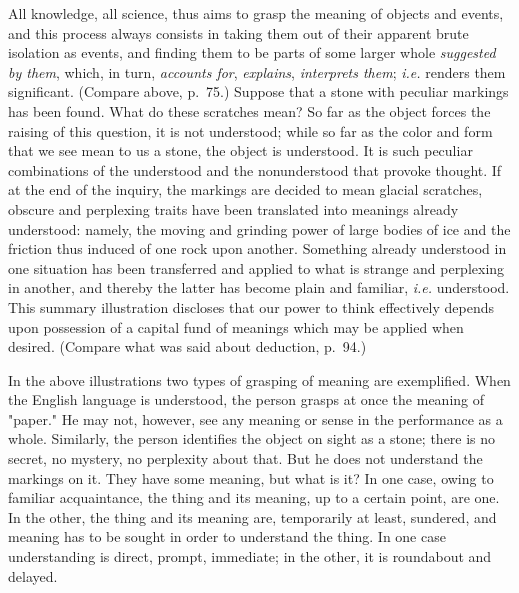 \documentclass[showtrims,ustradepaper]{memoir}
\begin{document}
All knowledge, all science, thus aims to grasp the meaning of objects
and events, and this process always consists in taking them out of their
apparent brute isolation as events, and finding them to be parts of
some
larger whole \emph{suggested by them}, which, in turn, \emph{accounts
for}, \emph{explains}, \emph{interprets them}; \emph{i.e.} renders them
significant. (Compare above, p.\ 75.) Suppose that a stone with peculiar
markings has been found. What do these scratches mean? So far as the
object forces the raising of this question, it is not understood; while
so far as the color and form that we see mean to us a stone, the object
is understood. It is such peculiar combinations of the understood and
the nonunderstood that provoke thought. If at the end of the inquiry,
the markings are decided to mean glacial scratches, obscure and
perplexing traits have been translated into meanings already understood:
namely, the moving and grinding power of large bodies of ice and the
friction thus induced of one rock upon another. Something already
understood in one situation has been transferred and applied to what is
strange and perplexing in another, and thereby the latter has become
plain and familiar, \emph{i.e.} understood. This summary illustration
discloses that our power to think effectively depends upon possession of
a capital fund of meanings which may be applied when desired. (Compare
what was said about deduction, p.\ 94.)



In the above illustrations two types of grasping of meaning are
exemplified. When the English language is understood, the person grasps
at once the meaning of "paper." He may not, however, see any meaning or
sense in the performance as a whole. Similarly, the person identifies
the object on sight as a stone; there is no secret, no mystery, no
perplexity about that. But he does not understand the markings on it.
They
have
some meaning, but what is it? In one case, owing to familiar
acquaintance, the thing and its meaning, up to a certain point, are one.
In the other, the thing and its meaning are, temporarily at least,
sundered, and meaning has to be sought in order to understand the thing.
In one case understanding is direct, prompt, immediate; in the other, it
is roundabout and delayed.

\end{document}

